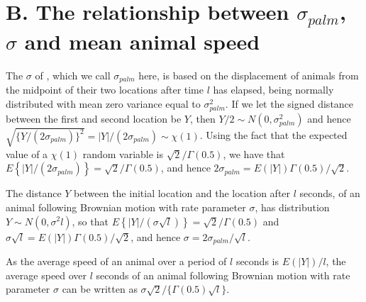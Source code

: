 \documentclass[useAMS, usenatbib, referee]{biom}\usepackage[]{graphicx}\usepackage[]{color}
\begin{document}


\section{B. The relationship between $\sigma_{palm}$, $\sigma$ and mean animal speed}
\label{appx:sigmaspd}

The $\sigma$ of \cite{Stevenson+al:18}, which we call $\sigma_{palm}$ here, is based on the displacement of animals from the midpoint of their two locations after time $l$ has elapsed, being normally distributed with mean zero variance equal to $\sigma_{palm}^2$. If we let the signed distance between the first and second location be $Y$, then $Y/2\sim N(0,\sigma_{palm}^2)$ and hence $\sqrt{\{Y/(2\sigma_{palm})\}^2}=|Y|/(2\sigma_{palm})\sim\chi(1)$. Using the fact that the expected value of a $\chi(1)$ random variable is $\sqrt{2}/\Gamma(0.5)$, we have that $E\left\{|Y|/(2\sigma_{palm})\right\}=\sqrt{2}/\Gamma(0.5)$, and hence $2\sigma_{palm}=E(|Y|)\Gamma(0.5)/\sqrt{2}$.

The distance $Y$ between the initial location and the location after $l$ seconds, of an animal following Brownian motion with rate parameter $\sigma$, has distribution $Y\sim N(0,\sigma^2l)$, so that $E\left\{|Y|/(\sigma\sqrt{l})\right\}=\sqrt{2}/\Gamma(0.5)$ and $\sigma\sqrt{l}=E(|Y|)\Gamma(0.5)/\sqrt{2}$, and hence $\sigma=2\sigma_{palm}/\sqrt{l}$.

As the average speed of an animal over a period of $l$ seconds is $E(|Y|)/l$, the average speed over $l$ seconds of an animal following Brownian motion with rate parameter $\sigma$ can be written as $\sigma\sqrt{2}/\{\Gamma(0.5)\sqrt{l}\}$.

\end{document}
